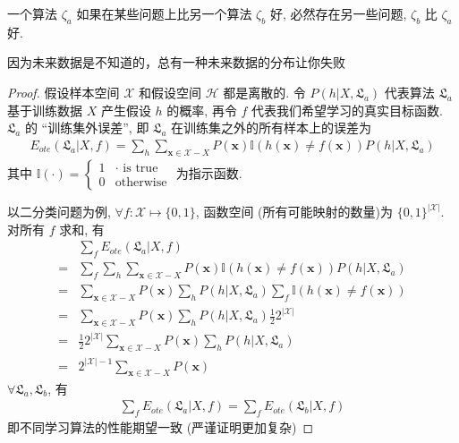 \begin{theorem}
    一个算法 $\zeta_a$ 如果在某些问题上比另一个算法 $\zeta_b$ 好, 必然存在另一些问题, $\zeta_b$ 比 $\zeta_a$ 好.
\end{theorem}
因为未来数据是不知道的，总有一种未来数据的分布让你失败
\begin{proof}
    假设样本空间 $\mathcal{X}$ 和假设空间 $\mathcal{H}$ 都是离散的. 令 $P(h|X, \mathfrak{L}_a)$ 代表算法 $\mathfrak{L}_a$ 基于训练数据 $X$ 产生假设 $h$ 的概率, 再令 $f$ 代表我们希望学习的真实目标函数. $\mathfrak{L}_a$ 的 ``训练集外误差'', 即 $\mathfrak{L}_a$ 在训练集之外的所有样本上的误差为
    \begin{align*}
        E_{ote}(\mathfrak{L}_a|X, f)=\sum_h\sum_{\bm{x}\in \mathcal{X}-X}P(\bm{x}) \mathbb{I} (h(\bm x) \ne f (\bm x ))P(h|X,\mathfrak{L}_a)
    \end{align*}
    其中 $\mathbb{I}(\cdot)=\left\{ \begin{array}{ll}
        1 & \cdot\text{ is true}\\0 & \text{otherwise}
    \end{array} \right.$ 为指示函数.

    以二分类问题为例, $\forall f: \mathcal{X} \mapsto \{0,1\}$, 函数空间 (所有可能映射的数量)为 $\{0,1\}^{|\mathcal{X}|}$. 对所有 $f$ 求和, 有
    \begin{align*}
        &\sum_f E_{ote}(\mathfrak{L}_a|X, f)\\
        =&\sum_f \sum_h\sum_{\bm{x}\in \mathcal{X}-X}P(\bm{x}) \mathbb{I} (h(\bm x) \ne f (\bm x ))P(h|X,\mathfrak{L}_a)\\
        =&\sum_{\bm{x}\in \mathcal{X}-X}P(\bm x)\sum_h P(h|X,\mathfrak{L}_a)\sum_f \mathbb{I}(h(\bm x) \ne f (\bm x ))\\
        =&\sum_{\bm{x}\in \mathcal{X}-X}P(\bm x)\sum_h P(h|X,\mathfrak{L}_a)\frac{1}{2}2^{|\mathcal{X}|}\\
        =&\frac{1}{2}2^{|\mathcal{X}|}\sum_{\bm{x}\in \mathcal{X}-X}P(\bm x)\sum_h P(h|X,\mathfrak{L}_a)\\
        =&2^{|\mathcal{X}|-1}\sum_{\bm{x}\in \mathcal{X}-X}P(\bm x) 
    \end{align*}
    $\forall \mathfrak{L}_a, \mathfrak{L}_b$, 有
    \begin{align*}
        \sum_f E_{ote}(\mathfrak{L}_a|X, f)=\sum_f E_{ote}(\mathfrak{L}_b|X, f)
    \end{align*} 
    即不同学习算法的性能期望一致 (严谨证明更加复杂)
\end{proof}

